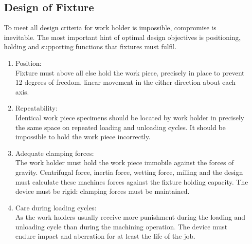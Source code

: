 \documentclass[16pt,a4paper]{article}
\begin{document}
\subsection{Design of Fixture}
To meet all design criteria for work holder is impossible, compromise is inevitable. The most important hint of optimal design objectives is  positioning, holding and supporting functions that fixtures must fulfil.
\begin{enumerate}
\item Position: \\     
Fixture must above all else hold the work piece,  precisely in place to prevent 12 degrees of freedom, linear movement in the either direction about each axis.
\item Repeatability: \\   
Identical work piece specimens should be located by work holder in precisely the same space on repeated loading and unloading cycles. It should be impossible to hold the work piece incorrectly.
\item Adequate clamping forces: \\   
 The work holder must hold the work piece immobile against the forces of gravity. Centrifugal force, inertia force, wetting force, milling and the design must calculate these machines forces against the fixture holding capacity. The device must be rigid: clamping forces must be maintained.
\item Care during loading cycles:  \\    
As the work holders usually receive more punishment during the loading and unloading cycle  than during the machining operation. The device must endure impact and aberration for at least the  life of the job.

\end{enumerate}
\end{document}
